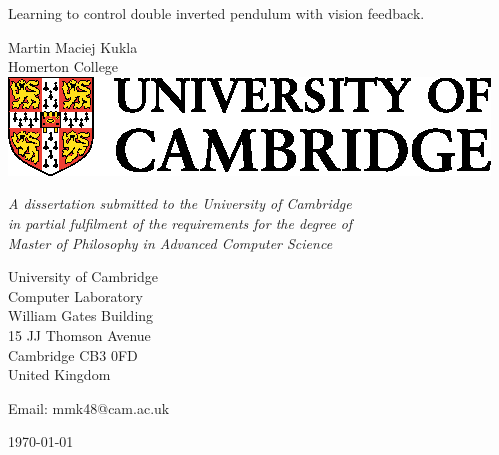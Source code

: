 \begin{titlepage} 

\begin{center}
\noindent
\huge
Learning to control double inverted pendulum with vision feedback. \\
\end{center}

\begin{center}
\noindent
\huge
Martin Maciej Kukla \\
\Large
Homerton College     \\[24pt]
\includegraphics{CUni3.eps}
\end{center}

\vspace{24pt} 

\begin{center}
\noindent
\large
{\it A dissertation submitted to the University of Cambridge \\ 
in partial fulfilment of the requirements for the degree of \\ 
Master of Philosophy in Advanced Computer Science} 
\end{center}

\begin{center}
\noindent
University of Cambridge \\
Computer Laboratory     \\
William Gates Building  \\
15 JJ Thomson Avenue    \\
Cambridge CB3 0FD       \\
{\sc United Kingdom}    \\
\end{center}

\begin{center}
\noindent
Email: mmk48@cam.ac.uk \\
\end{center}

\begin{center}
\noindent
\today
\end{center}

\end{titlepage} 

\newpage
\vspace*{\fill}
